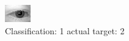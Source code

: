 \begin{figure}[h!]
\begin{center}
\includegraphics[width=0.60\columnwidth]{figures/ID446_class_1_target_2.png}
\end{center}
\caption{ Classification: 1 actual target: 2}
\label{fig:ID446_class_1_target_2}
\end{figure}
